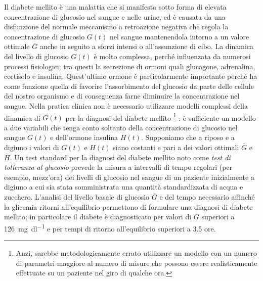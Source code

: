 Il diabete mellito è una malattia che si manifesta sotto forma di
elevata concentrazione di glucosio nel sangue e nelle urine, ed è causata
da una disfunzione del normale meccanismo a retroazione negativa che regola
la concentrazione di glucosio $G(t)$ nel sangue mantenendola intorno
a un valore ottimale $\bar{G}$ anche in seguito a sforzi intensi o all'assunzione
di cibo. La dinamica del livello di glucosio $G(t)$ è molto complessa,
perché influenzata da numerosi processi fisiologici; tra questi la secrezione
di ormoni quali glucagone, adrenalina, cortisolo e insulina.
Quest'ultimo ormone è particolarmente importante perché ha come funzione
quella di favorire l'assorbimento del glucosio da parte delle cellule del nostro
organismo e di conseguenza farne diminuire la concentrazione nel sangue.
Nella pratica clinica non è necessario utilizzare modelli complessi
della dinamica di $G(t)$ per la diagnosi del diabete mellito%
\footnote{Anzi, sarebbe metodologicamente errato utilizzare un modello
con un numero di parametri maggiore al numero di misure che possono essere
realisticamente effettuate su un paziente nel giro di qualche ora.}%
: è sufficiente un modello a due variabili che tenga conto soltanto
della concentrazione di glucosio nel sangue $G(t)$ e dell'ormone insulina $H(t)$.
Supponiamo che a riposo e a digiuno i valori di $G(t)$ e $H(t)$ siano costanti
e pari a dei valori ottimali $\bar{G}$ e~$\bar{H}$. Un test standard per
la diagnosi del diabete mellito noto come \emph{test di tolleranza al glucosio}
prevede la misura a intervalli di tempo regolari (per esempio, mezz'ora)
dei livelli di glucosio nel sangue di un paziente inizialmente a digiuno a cui
sia stata somministrata una quantità standardizzata di acqua e zucchero.
L'analisi del livello basale di glucosio $\bar{G}$ e del tempo necessario affinché
la glicemia ritorni all'equilibrio permettono di formulare una diagnosi di diabete
mellito; in particolare il diabete è diagnosticato per valori di $\bar{G}$
superiori a \SI{126}{mg.dl^{-1}} e per tempi di ritorno all'equilibrio superiori
a 3.5 ore.

